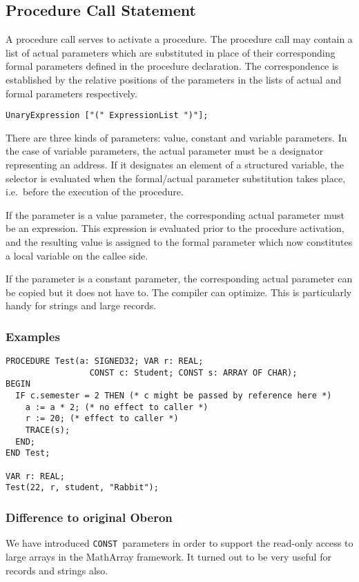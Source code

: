 \documentclass[a4wide,11pt]{article}
\newcommand{\CONST}{\lstinline"CONST"}
\begin{document}
\subsection{Procedure Call Statement}
A procedure call serves to activate a procedure.
The procedure call may contain a list of actual parameters which are substituted in place of their corresponding formal parameters defined in the procedure declaration.
The correspondence is established by the relative positions of the parameters in the lists of actual and formal parameters respectively.

\begin{lstlisting}[style=ebnf]
	UnaryExpression ["(" ExpressionList ")"];
\end{lstlisting}

There are three kinds of parameters: value, constant and variable parameters.
In the case of variable parameters, the actual parameter must be a designator representing an address.
If it designates an element of a structured variable, the selector is evaluated when the formal/actual parameter substitution takes place, i.e.\ before the execution of the procedure.

If the parameter is a value parameter, the corresponding actual parameter must be an expression.
This expression is evaluated prior to the procedure activation, and the resulting value is assigned to the formal parameter which now constitutes a local variable on the callee side.

If the parameter is a constant parameter, the corresponding actual parameter can be copied but it does not have to.
The compiler can optimize.
This is particularly handy for strings and large records.

\begin{annotation}
\subsubsection{Examples}
\begin{lstlisting}[style=example]
PROCEDURE Test(a: SIGNED32; VAR r: REAL;
                 CONST c: Student; CONST s: ARRAY OF CHAR);
BEGIN
  IF c.semester = 2 THEN (* c might be passed by reference here *)
    a := a * 2; (* no effect to caller *)
    r := 20; (* effect to caller *)
    TRACE(s);
  END;
END Test;

VAR r: REAL;
Test(22, r, student, "Rabbit");
\end{lstlisting}

\subsubsection{Difference to original Oberon}
We have introduced \CONST\ parameters in order to support the read-only access to large arrays in the MathArray framework.
It turned out to be very useful for records and strings also.
\end{annotation}
\end{document}
